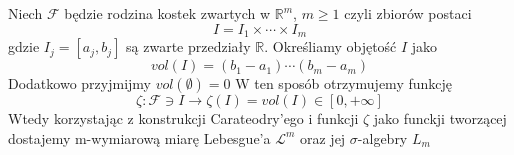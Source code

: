 \begin{defi}
	Niech $\mathcal{F}$ będzie rodzina kostek zwartych w $\mathbb{R}^m$, $m \geq 1$ czyli zbiorów postaci $$
		I = I_1 \times \cdots \times I_m
	$$gdzie $I_j=[a_j, b_j]$ są zwarte przedziały $\mathbb{R}$. Określiamy objętość $I$ jako $$
		vol(I) = (b_1 - a_1) \cdots (b_m - a_m)
	$$
	Dodatkowo przyjmijmy $vol(\emptyset) = 0$\newline
	W ten sposób otrzymujemy funkcję $$
		\zeta: \mathcal{F} \ni I \rightarrow \zeta(I) = vol(I) \in [0, + \infty]
	$$
	Wtedy korzystając z konstrukcji Carateodry'ego i funkcji $\zeta$ jako funckji tworzącej dostajemy m-wymiarową miarę Lebesgue'a $\mathcal{L}^m$ oraz jej $\sigma$-algebry $L_m$ 
\end{defi}